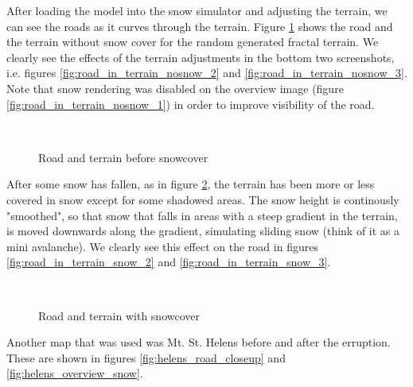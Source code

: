 After loading the model into the snow simulator and adjusting the terrain, we can see the roads as it curves through the terrain. Figure \ref{fig:road_in_terrain_nosnow} shows the road and the terrain without snow cover for the random generated fractal terrain. We clearly see the effects of the terrain adjustments in the bottom two screenshots, i.e. figures \ref{fig:road_in_terrain_nosnow_2} and \ref{fig:road_in_terrain_nosnow_3}. Note that snow rendering was disabled on the overview image (figure \ref{fig:road_in_terrain_nosnow_1}) in order to improve visibility of the road. 

\begin{figure}[ht]
\centering
{}\\
\quad
{}
\caption{Road and terrain before snowcover}
\label{fig:road_in_terrain_nosnow}
\end{figure}

After some snow has fallen, as in figure \ref{fig:road_in_terrain_snow}, the terrain has been more or less covered in snow except for some shadowed areas. The snow height is continously "smoothed", so that snow that falls in areas with a steep gradient in the terrain, is moved downwards along the gradient, simulating sliding snow (think of it as a mini avalanche). We clearly see this effect on the road in figures \ref{fig:road_in_terrain_snow_2} and \ref{fig:road_in_terrain_snow_3}.

\begin{figure}[ht]
\centering
{}\\
\quad
{}
\caption{Road and terrain with snowcover}
\label{fig:road_in_terrain_snow}
\end{figure}

Another map that was used was Mt. St. Helens before and after the erruption. These are shown in figures \ref{fig:helens_road_closeup} and \ref{fig:helens_overview_snow}.

